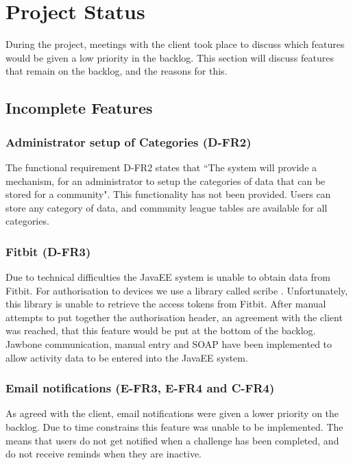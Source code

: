 \chapter{Project Status}

During the project, meetings with the client took place to discuss which features would be given a low priority in the backlog. This section will discuss features that remain on the backlog, and the reasons for this.

\section{Incomplete Features}

\subsection{Administrator setup of Categories (D-FR2)}
The functional requirement D-FR2 states that ``The system will provide a mechanism, for an administrator to setup the categories of data that can be stored for a community". This functionality has not been provided. Users can store any category of data, and community league tables are available for all categories.

\subsection{Fitbit (D-FR3)}
Due to technical difficulties the JavaEE system is unable to obtain data from Fitbit. For authorisation to devices we use a library called scribe \cite{scribe}. Unfortunately, this library is unable to retrieve the access tokens from Fitbit. After manual attempts to put together the authorisation header, an agreement with the client was reached, that this feature would be put at the bottom of the backlog. Jawbone communication, manual entry and SOAP have been implemented to allow activity data to be entered into the JavaEE system.

\subsection{Email notifications (E-FR3, E-FR4 and C-FR4)}

As agreed with the client, email notifications were given a lower priority on the backlog. Due to time constrains this feature was unable to be implemented. The means that users do not get notified when a challenge has been completed, and do not receive reminds when they are inactive. 

